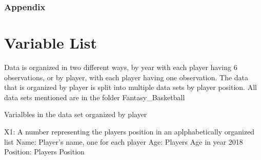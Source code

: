 \documentclass[]{article}
\begin{document}
\subsubsection{Appendix}\label{appendix}

\section{Variable List}\label{variable-list}

Data is organized in two different ways, by year with each player having
6 observations, or by player, with each player having one observation.
The data that is organized by player is split into multiple data sets by
player position. All data sets mentioned are in the folder
Fantasy\_Basketball

Varialbles in the data set organized by player

X1: A number representing the players position in an aplphabetically
organized list Name: Player's name, one for each player Age: Players Age
in year 2018 Position: Players Position
\end{document}

